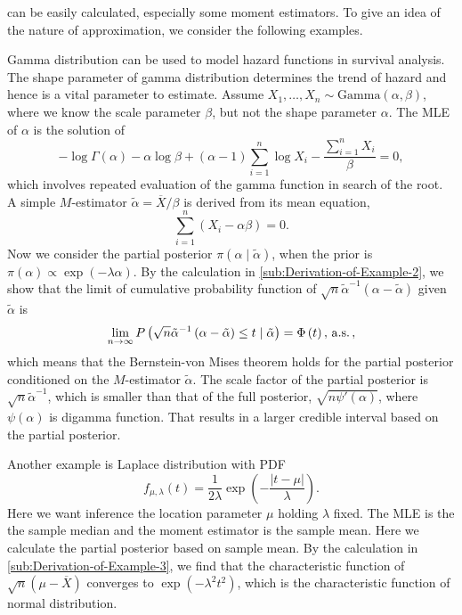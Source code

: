 can be easily calculated, especially some moment estimators. To give
an idea of the nature of approximation, we consider the following
examples.
\begin{example}
\label{exa:Gamma-distribution}Gamma distribution can be used to model
hazard functions in survival analysis. The shape parameter of gamma
distribution determines the trend of hazard and hence is a vital parameter
to estimate. Assume $X_{1},\ldots,X_{n}\sim\mathrm{Gamma}\left(\alpha,\beta\right)$,
where we know the scale parameter $\beta$, but not the shape parameter
$\alpha$. The MLE of $\alpha$ is the solution of 
\[
-\log\Gamma\left(\alpha\right)-\alpha\log\beta+\left(\alpha-1\right)\sum_{i=1}^{n}\log X_{i}-\frac{\sum_{i=1}^{n}X_{i}}{\beta}=0,
\]
which involves repeated evaluation of the gamma function in search
of the root. A simple $M$-estimator $\tilde{\alpha}=\overline{X}/\beta$
is derived from its mean equation, 
\[
\sum_{i=1}^{n}\left(X_{i}-\alpha\beta\right)=0.
\]
 Now we consider the partial posterior $\pi\left(\alpha\mid\tilde{\alpha}\right)$,
when the prior is $\pi\left(\alpha\right)\propto\exp\left(-\lambda\alpha\right)$.
By the calculation in  \ref{sub:Derivation-of-Example-2}, we show
that the limit of cumulative probability function of $\sqrt{n}\tilde{\alpha}^{-1}\left(\alpha-\tilde{\alpha}\right)$
given $\tilde{\alpha}$ is 
\[
\lim_{n\rightarrow\infty}P\left(\sqrt{n}\tilde{\alpha}^{-1}\left(\alpha-\tilde{\alpha}\right)\le t\mid\tilde{\alpha}\right)=\Phi\left(t\right),\,\mathrm{a.s.}\,,
\]
which means that the Bernstein-von Mises theorem holds for the partial
posterior conditioned on the $M$-estimator $\tilde{\alpha}$. The
scale factor of   the partial posterior is $\sqrt{n}\tilde{\alpha}^{-1}$,
which is smaller than that of {the
} full posterior, $\sqrt{n\psi'\left(\alpha\right)}$,
where $\psi\left(\alpha\right)$ is digamma function. That results
in a larger credible interval based on the partial posterior. 
\begin{example}
\label{exa:laplace-example}Another example is Laplace distribution
with PDF 
\[
f_{\mu,\lambda}\left(t\right)=\frac{1}{2\lambda}\exp\left(-\frac{\left|t-\mu\right|}{\lambda}\right).
\]
 Here we want inference the location parameter $\mu$ holding $\lambda$
fixed. The MLE is the {the } sample
median and the moment estimator is {the
}sample mean. Here we calculate the partial posterior based on sample
mean. By the calculation in  \ref{sub:Derivation-of-Example-3}, we
find that the characteristic function of $\sqrt{n}\left(\mu-\overline{X}\right)$
converges to $\exp\left(-\lambda^{2}t^{2}\right)$, which is the characteristic
function of normal distribution. 
\end{example}
\end{example}
